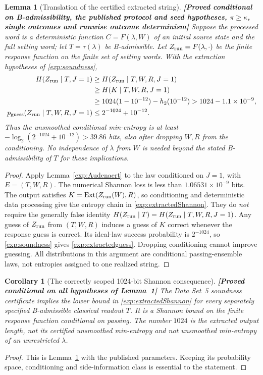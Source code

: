 \documentclass[11pt,a4paper]{article}
\newtheorem{lemma}[theorem]{Lemma}
\newtheorem{corollary}[theorem]{Corollary}
\theoremstyle{definition}
\theoremstyle{remark}\newtheorem{remark}[theorem]{Remark}
\newcommand{\status}[1]{\textbf{[#1]}\quad}
\begin{document}
\begin{lemma}[Translation of the certified extracted string]\label{exp:translation}
\status{Proved conditional on B-admissibility, the published protocol and seed hypotheses, $\pi\ge\kappa$, single outcomes and runwise outcome determinism}
Suppose the processed word is a deterministic function
$C=F(\lambda,W)$ of an initial source state and the full setting word; let $T=\tau(\lambda)$ be B-admissible. Let
$Z_{\rm run}=F(\lambda,\cdot)$ be the finite response function on the finite set of setting words. With the extraction hypotheses of \eqref{exp:soundness},
\begin{align}
 H(Z_{\rm run}\mid T,J=1)
 &\ge H(Z_{\rm run}\mid T,W,R,J=1)\nonumber\\
 &\ge H(K\mid T,W,R,J=1)\nonumber\\
 &\ge1024(1-10^{-12})-h_2(10^{-12})
 >1024-1.1\times10^{-9},\label{exp:extractedShannon}\\
 p_{\rm guess}(Z_{\rm run}\mid T,W,R,J=1)
 &\le2^{-1024}+10^{-12}.\label{exp:extractedguess}
\end{align}
Thus the unsmoothed conditional min-entropy is at least
$-\log_2(2^{-1024}+10^{-12})>39.86$ bits, also after dropping $W,R$ from the conditioning. No independence of $\lambda$ from $W$ is needed beyond the stated B-admissibility of $T$ for these implications.
\end{lemma}
\begin{proof}
Apply Lemma~\ref{exp:Audenaert} to the law conditioned on $J=1$, with $E=(T,W,R)$. The numerical Shannon loss is less than
$1.06531\times10^{-9}$ bits. The output satisfies
$K=\mathrm{Ext}(Z_{\rm run}(W),R)$, so conditioning and deterministic data processing give the entropy chain in \eqref{exp:extractedShannon}. They do \emph{not} require the generally false identity
$H(Z_{\rm run}\mid T)=H(Z_{\rm run}\mid T,W,R,J=1)$.
Any guess of $Z_{\rm run}$ from $(T,W,R)$ induces a guess of $K$ correct whenever the response guess is correct. Its ideal-law success probability is $2^{-1024}$, so \eqref{exp:soundness} gives \eqref{exp:extractedguess}. Dropping conditioning cannot improve guessing. All distributions in this argument are conditional passing-ensemble laws, not entropies assigned to one realized string.
\end{proof}

\begin{corollary}[The correctly scoped 1024-bit Shannon consequence]\label{exp:bierhorst}
\status{Proved conditional on all hypotheses of Lemma~\ref{exp:translation}}
The Data Set~5 soundness certificate implies the lower bound in \eqref{exp:extractedShannon} for every separately specified B-admissible classical readout $T$. It is a Shannon bound on the finite response function conditional on passing. The number $1024$ is the extracted output length, not its certified unsmoothed min-entropy and not unsmoothed min-entropy of an unrestricted $\lambda$.
\end{corollary}
\begin{proof}
This is Lemma~\ref{exp:translation} with the published parameters. Keeping its probability space, conditioning and side-information class is essential to the statement.
\end{proof}
\end{document}

